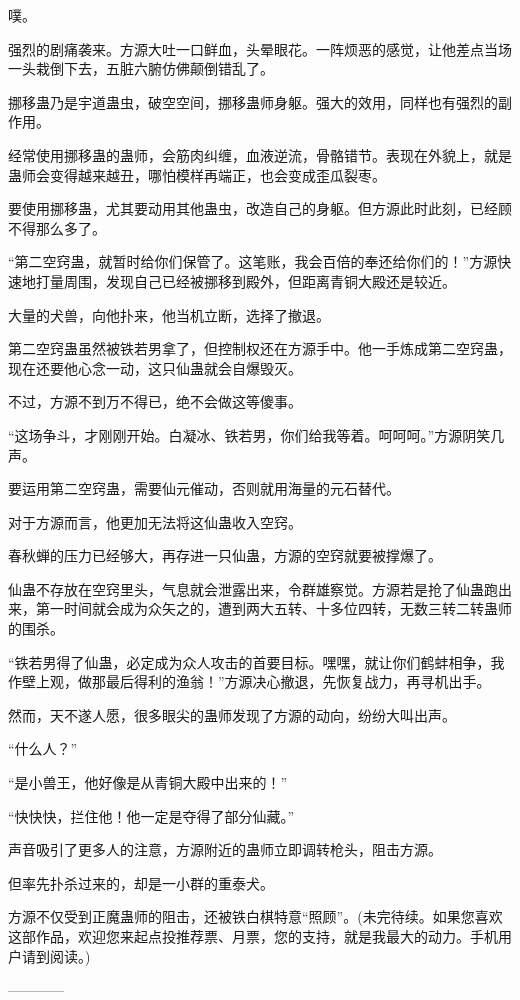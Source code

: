 \begin{this_body}
噗。

强烈的剧痛袭来。方源大吐一口鲜血，头晕眼花。一阵烦恶的感觉，让他差点当场一头栽倒下去，五脏六腑仿佛颠倒错乱了。

挪移蛊乃是宇道蛊虫，破空空间，挪移蛊师身躯。强大的效用，同样也有强烈的副作用。

经常使用挪移蛊的蛊师，会筋肉纠缠，血液逆流，骨骼错节。表现在外貌上，就是蛊师会变得越来越丑，哪怕模样再端正，也会变成歪瓜裂枣。

要使用挪移蛊，尤其要动用其他蛊虫，改造自己的身躯。但方源此时此刻，已经顾不得那么多了。

“第二空窍蛊，就暂时给你们保管了。这笔账，我会百倍的奉还给你们的！”方源快速地打量周围，发现自己已经被挪移到殿外，但距离青铜大殿还是较近。

大量的犬兽，向他扑来，他当机立断，选择了撤退。

第二空窍蛊虽然被铁若男拿了，但控制权还在方源手中。他一手炼成第二空窍蛊，现在还要他心念一动，这只仙蛊就会自爆毁灭。

不过，方源不到万不得已，绝不会做这等傻事。

“这场争斗，才刚刚开始。白凝冰、铁若男，你们给我等着。呵呵呵。”方源阴笑几声。

要运用第二空窍蛊，需要仙元催动，否则就用海量的元石替代。

对于方源而言，他更加无法将这仙蛊收入空窍。

春秋蝉的压力已经够大，再存进一只仙蛊，方源的空窍就要被撑爆了。

仙蛊不存放在空窍里头，气息就会泄露出来，令群雄察觉。方源若是抢了仙蛊跑出来，第一时间就会成为众矢之的，遭到两大五转、十多位四转，无数三转二转蛊师的围杀。

“铁若男得了仙蛊，必定成为众人攻击的首要目标。嘿嘿，就让你们鹤蚌相争，我作壁上观，做那最后得利的渔翁！”方源决心撤退，先恢复战力，再寻机出手。

然而，天不遂人愿，很多眼尖的蛊师发现了方源的动向，纷纷大叫出声。

“什么人？”

“是小兽王，他好像是从青铜大殿中出来的！”

“快快快，拦住他！他一定是夺得了部分仙藏。”

声音吸引了更多人的注意，方源附近的蛊师立即调转枪头，阻击方源。

但率先扑杀过来的，却是一小群的重泰犬。

方源不仅受到正魔蛊师的阻击，还被铁白棋特意“照顾”。(未完待续。如果您喜欢这部作品，欢迎您来起点投推荐票、月票，您的支持，就是我最大的动力。手机用户请到阅读。)

------------

\end{this_body}

